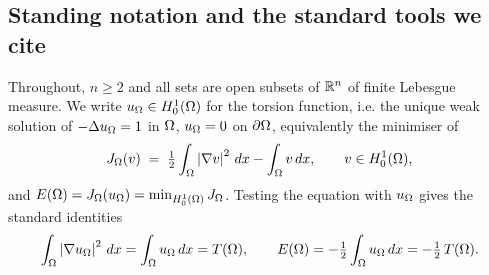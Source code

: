\subsection{Standing notation and the standard tools we cite}
\label{ssec:notation}

Throughout, $n\ge2$ and all sets are open subsets of $\mathbb R^n$ of finite
Lebesgue measure. We write $u_\Omega\in H^1_0(\Omega)$ for the torsion
function, i.e. the unique weak solution of $-\Delta u_\Omega=1$ in $\Omega$,
$u_\Omega=0$ on $\partial\Omega$, equivalently the minimiser of
\begin{equation}\label{eq:energy-def}
   J_\Omega(v)\;=\;\tfrac12\int_\Omega\left|\nabla v\right|^2\,dx-\int_\Omega v\,dx,
   \qquad v\in H^1_0(\Omega),
\end{equation}
and $E(\Omega)=J_\Omega(u_\Omega)=\min_{H^1_0(\Omega)}J_\Omega$.
Testing the equation with $u_\Omega$ gives the standard identities
\begin{equation}\label{eq:energy-identities}
   \int_\Omega\left|\nabla u_\Omega\right|^2\,dx=\int_\Omega u_\Omega\,dx=T(\Omega),
   \qquad
   E(\Omega)=-\tfrac12\int_\Omega u_\Omega\,dx=-\tfrac12\,T(\Omega).
\end{equation}

